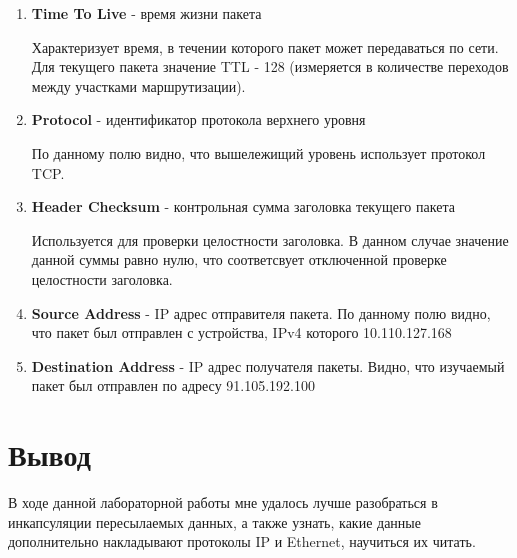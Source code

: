 \documentclass[a4paper]{article}
\begin{document}
\begin{enumerate}
{      Необходимо выстроения полученных фрагментов в правильном порядке.
      Так как для данного пакета фрагментирование не используется,
      данное поле установлено в 0.
    }
    \item {
      \textbf{Time To Live} - время жизни пакета 

      Характеризует время, в течении которого пакет может передаваться по сети.
      Для текущего пакета значение TTL - 128 (измеряется в количестве переходов
      между участками маршрутизации).
    }
    \item {
      \textbf{Protocol} - идентификатор протокола верхнего уровня

      По данному полю видно, что вышележищий уровень использует протокол TCP.
    }
    \item {
      \textbf{Header Checksum} - контрольная сумма заголовка текущего пакета 

      Используется для проверки целостности заголовка. В данном случае 
      значение данной суммы равно нулю, что соответсвует отключенной
      проверке целостности заголовка.
    }
    \item {
      \textbf{Source Address} - IP адрес отправителя пакета. По данному полю видно,
      что пакет был отправлен с устройства, IPv4 которого 10.110.127.168
    }
    \item {
      \textbf{Destination Address} - IP адрес получателя пакеты. Видно, что 
      изучаемый пакет был отправлен по адресу 91.105.192.100
    }
  \end{enumerate}

  \newpage
  \section{Вывод}

  В ходе данной лабораторной работы мне удалось лучше разобраться в инкапсуляции
  пересылаемых данных, а также узнать, какие данные дополнительно накладывают 
  протоколы IP и Ethernet, научиться их читать.
\end{document}
